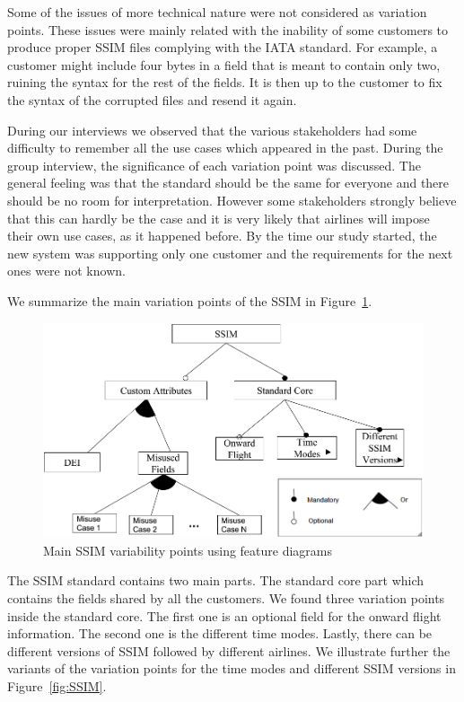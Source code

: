 Some of the issues of more technical nature were not considered as variation points. These issues were mainly related with the inability of some customers to produce proper SSIM files complying with the IATA standard. For example, a customer might include four bytes in a field that is meant to contain only two, ruining the syntax for the rest of the fields. It is then up to the customer to fix the syntax of the corrupted files and resend it again. 

During our interviews we observed that the various stakeholders had some difficulty to remember all the use cases which appeared in the past. During the group interview, the significance of each variation point was discussed. The general feeling was that the standard should be the same for everyone and there should be no room for interpretation. However some stakeholders strongly believe that this can hardly be the case and it is very likely that airlines will impose their own use cases, as it happened before. By the time our study started, the new system was supporting only one customer and the requirements for the next ones were not known. 


We summarize the main variation points of the SSIM in Figure~\ref{fig:SSIMvariability}.

\begin{figure}[h]
\centering
\includegraphics[width=\columnwidth]{figure/figure12.png}

\caption{ Main SSIM variability points using feature diagrams}
\label{fig:SSIMvariability}
\end{figure}



The SSIM standard contains two main parts. The standard core part which contains the fields shared by all the customers.
We found three variation points inside the standard core.
The first one is an optional field for the onward flight information. The second one is the different time modes. Lastly, there can be different versions of SSIM followed by different airlines. We illustrate further the variants of the variation points for the time modes and different SSIM versions in Figure~\ref{fig:SSIM}. %

